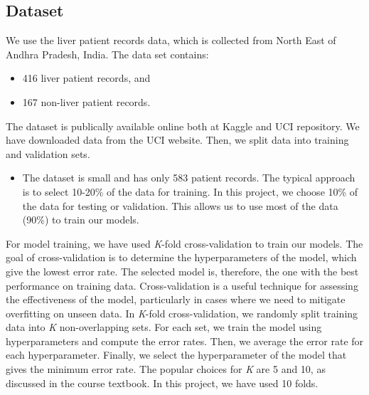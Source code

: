 \documentclass[]{article}
\begin{document}
\subsection{Dataset}
\label{sec:dataset}

We use the liver patient records data, which is collected from North
East of Andhra Pradesh, India. The data set contains:

\begin{itemize}
\item 416 liver patient records, and 
\item 167 non-liver patient records.
\end{itemize}

The dataset is publically available online both at Kaggle and UCI
repository. We have downloaded data from the UCI website. Then, we split
data into training and validation sets.

\begin{itemize}
\item The dataset is small and has only 583 patient records. The typical approach is to select 10-20\% of 
the data for training. In this project, we choose 10\% of the data for testing or validation. This allows us to use most 
of the data (90\%) to train our models. 
\end{itemize}

For model training, we have used \emph{K}-fold cross-validation to train our models. The goal of cross-validation is to determine the hyperparameters of the model, which give the lowest error rate. The selected model is, therefore, the one with the best performance on training data. Cross-validation is a useful technique for assessing the effectiveness of the model, particularly in cases where we need to mitigate overfitting on unseen data. In \emph{K}-fold cross-validation, we randomly split training data into \emph{K} non-overlapping sets. For each set, we train the model using hyperparameters and compute the error rates. Then, we average the error rate for each hyperparameter. Finally, we select the hyperparameter of the model that gives the minimum error rate. The popular choices for \emph{K} are 5 and 10, as discussed in the course textbook. In this project, we have used 10 folds.
\end{document}
